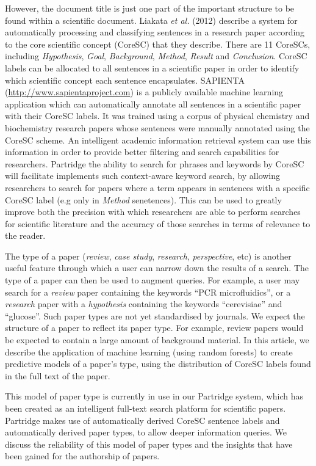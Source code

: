 \documentclass{svmult}
\begin{document}
However, the document title is just one part of the important structure to be
found within a scientific document.  Liakata \emph{et al.} (2012) describe a
system for automatically processing and classifying sentences in a research
paper according to the core scientific concept (CoreSC) that they
describe\cite{Liakata2012}.  There are 11 CoreSCs, including {\em Hypothesis},
{\em Goal}, {\it Background}, {\em Method}, {\em Result} and {\em Conclusion}.
CoreSC labels can be allocated to all sentences in a scientific paper in order
to identify which scientific concept each sentence encapsulates.  SAPIENTA
(\url{http://www.sapientaproject.com}) is a publicly available machine learning
application which can automatically annotate all sentences in a scientific
paper with their CoreSC labels. It was trained using a corpus of physical
chemistry and biochemistry research papers whose sentences were manually
annotated using the CoreSC\cite{LIAKATA10.644} scheme.  An intelligent academic
information retrieval system can use this information in order to provide
better filtering and search capabilities for researchers.  Partridge {\st the
ability to search for phrases and keywords by CoreSC will facilitate}
implements such context-aware keyword search, by allowing researchers to search
for papers where a term appears in sentences with a specific CoreSC label (e.g
only in {\em Method} senetences). This can be used to greatly improve both the
precision with which researchers are able to perform searches for scientific
literature and the accuracy of those searches in terms of relevance to the
reader.

The type of a paper ({\em review}, {\em case study}, {\em research}, {\em
perspective}, etc) is another useful feature through which a user can narrow
down the results of a search.  The type of a paper can then be used to augment
queries.  For example, a user may search for a {\em review} paper containing
the keywords ``PCR microfluidics'', or a {\em research} paper with a {\em
hypothesis} containing the keywords ``cerevisiae'' and ``glucose''.   Such
paper types are not yet standardised by journals.  We expect the structure of a
paper to reflect its paper type.  For example, review papers would be expected
to contain a large amount of background material.  In this article, we describe
the application of machine learning (using random forests) to create predictive
models of a paper's type, using the distribution of CoreSC labels found in the
full text of the paper. 

This model of paper type is currently in use in our Partridge system, which has
been created as an intelligent full-text search platform for scientific papers.
Partridge makes use of automatically derived CoreSC sentence labels and
automatically derived paper types, to allow deeper information queries.  We
discuss the reliability of this model of paper types and the insights that have
been gained for the authorship of papers.
\end{document}
